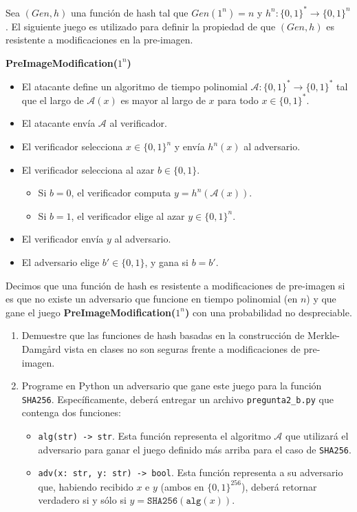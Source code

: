 
Sea $(\textit{Gen}, h)$ una función de hash tal que $\textit{Gen}(1^n) = n$ y  $h^n : \{0,1\}^* \to \{0,1\}^n$. El siguiente juego es utilizado para definir la propiedad de que $(\textit{Gen}, h)$ es resistente a modificaciones en la pre-imagen.

{\bf PreImageModification($1^n$)}
\begin{itemize}
\item El atacante define un algoritmo de tiempo polinomial $\mathcal{A}:\{0,1\}^*\rightarrow\{0,1\}^*$ tal que el largo de $\mathcal{A}(x)$ es mayor al largo de $x$ para todo $x\in\{0,1\}^*$.
\item El atacante envía $\mathcal{A}$ al verificador.
\item El verificador selecciona $x\in\{0, 1\}^n$ y envía $h^n(x)$ al adversario.
\item El verificador selecciona al azar $b\in\{0, 1\}$.
\begin{itemize}
\item Si $b=0$, el verificador computa $y=h^n(\mathcal{A}(x))$.
\item Si $b=1$, el verificador elige al azar $y\in\{0,1\}^n$.
\end{itemize}
\item El verificador envía $y$ al adversario.
\item El adversario elige $b'\in\{0,1\}$, y gana si $b=b'$.
\end{itemize}
Decimos que una función de hash es resistente a modificaciones de pre-imagen si es que no existe un adversario que funcione en tiempo polinomial (en $n$) y que gane el juego {\bf PreImageModification($1^n$)} con una probabilidad no despreciable.
\begin{enumerate}
\item Demuestre que las funciones de hash basadas en la construcción de Merkle-Damgård vista en clases no son seguras frente a modificaciones de pre-imagen.

\item Programe en Python un adversario que gane este juego para la función \texttt{SHA256}. Específicamente, deberá entregar un archivo \texttt{pregunta2\_b.py} que contenga dos funciones:
\begin{itemize}
\item \texttt{alg(str) -> str}. Esta función representa el algoritmo $\mathcal{A}$ que utilizará el adversario para ganar el juego definido más arriba para el caso de \texttt{SHA256}.
\item \texttt{adv(x: str, y: str) -> bool}. Esta función representa a su adversario que, habiendo recibido $x$ e $y$ (ambos en $\{0,1\}^{256}$), deberá retornar verdadero si y sólo si $y=\texttt{SHA256}(\texttt{alg}(x))$.
\end{itemize}

\end{enumerate}
